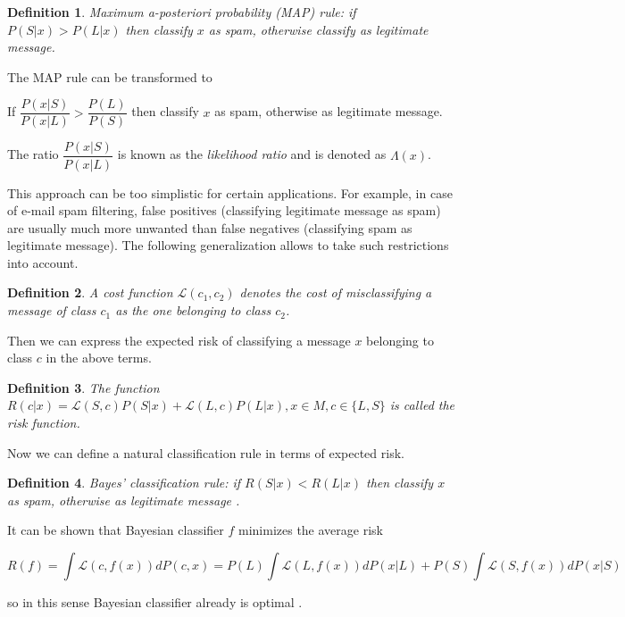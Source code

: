 \documentclass[12pt]{report}
\newcommand{\Loss}{\mathcal{L}}
\newtheorem{definition}{Definition}[section]
\begin{document}
\begin{definition}
	Maximum a-posteriori probability (MAP) rule: if $P(S | x) > P(L | x)$ then classify $x$ as spam, otherwise classify as legitimate message.
\end{definition}

The MAP rule can be transformed to

\begin{center}
	If $\dfrac{P(x | S)}{P(x | L)} > \dfrac{P(L)}{P(S)}$ then classify $x$ as spam, otherwise as legitimate message.
\end{center}

The ratio $\dfrac{P(x | S)}{P(x | L)}$ is known as the \textit{likelihood ratio} and is denoted as $\Lambda(x)$.

This approach can be too simplistic for certain applications. For example, in case of e-mail spam filtering, false positives (classifying legitimate message as spam) are usually much more unwanted than false negatives (classifying spam as legitimate message). The following generalization allows to take such restrictions into account.

\begin{definition}
	A cost function $\Loss(c_1, c_2)$ denotes the cost of misclassifying a message of class $c_1$ as the one belonging to class $c_2$.
\end{definition}

Then we can express the expected risk of classifying a message $x$ belonging to class $c$ in the above terms.

\begin{definition}
	The function $R(c | x) = \Loss(S, c) P(S |x) + \Loss(L, c) P(L | x), x \in M, c \in \{L, S\}$ is called the risk function.
\end{definition}

Now we can define a natural classification rule in terms of expected risk.

\begin{definition}
	Bayes' classification rule: if $R(S | x) < R(L | x)$ then classify $x$ as spam, otherwise as legitimate message \cite{Kecman}.
\end{definition}

It can be shown that Bayesian classifier $f$ minimizes the average risk

$$R(f) = \int \Loss(c, f(x)) dP(c, x) = P(L) \int \Loss(L, f(x))dP(x | L) + P(S) \int \Loss(S, f(x))dP(x | S)$$

so in this sense Bayesian classifier already is optimal \cite{Tretyakov}.
\end{document}
